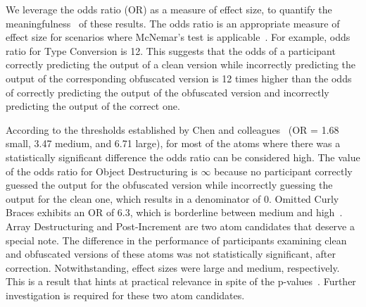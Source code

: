 We leverage the odds ratio (OR) as a measure of effect size, to quantify the meaningfulness~\cite{Ellis:2010:EGE} of these results. The odds ratio is an appropriate measure of effect size for scenarios where McNemar's test is applicable~\cite{Mangiafico:2016:SAE}. For example, odds ratio for Type Conversion is 12. This suggests that the odds of a participant correctly predicting the output of a clean version while incorrectly predicting the output of the corresponding obfuscated version is 12 times higher than the odds of correctly predicting the output of the obfuscated version and incorrectly predicting the output of the correct one. 

According to the thresholds established by Chen and colleagues~\cite{Chen:2010:HBB} (OR = 1.68 small, 3.47 medium, and 6.71 large), for most of the atoms where there was a statistically significant difference the odds ratio can be considered high. The value of the odds ratio for Object Destructuring is $\infty$ because no participant correctly guessed the output for the obfuscated version while incorrectly guessing the output for the clean one, which results in a denominator of 0. Omitted Curly Braces exhibits an OR of 6.3, which is borderline between medium and high~\cite{Chen:2010:HBB}. Array Destructuring and Post-Increment are two atom candidates that deserve a special note. The difference in the performance of participants examining clean and obfuscated versions of these atoms was not statistically significant, after correction. Notwithstanding, effect sizes were large and medium, respectively. This is a result that hints at practical relevance in spite of the p-values~\cite{Ellis:2010:EGE}. Further investigation is required for these two atom candidates.

